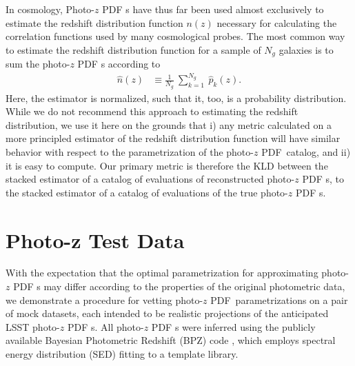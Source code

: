 \documentclass[\docopts]{\docclass}
\newcommand{\pz}{photo-$z$ PDF\xspace}
\newcommand{\Pz}{Photo-$z$ PDF\xspace}
\begin{document}
In cosmology, \Pz s have thus far been used almost exclusively to estimate the redshift
distribution function $n(z)$ necessary for calculating the correlation
functions used by many cosmological probes.  The most common way to estimate
the redshift distribution function for a sample of $N_{g}$ galaxies is to sum the \pz s according to
\begin{align}
  \label{eq:nz}
  \hat{n}(z) &\equiv \frac{1}{N_{g}}\ \sum_{k=1}^{N_{g}}\ \hat{p}_{k}(z).
\end{align}
Here, the
estimator is normalized, such that it, too, is a probability distribution.
While we do not recommend this
approach to estimating the redshift distribution,
we use it here on the grounds that i) any metric calculated on a more principled estimator of the
redshift distribution function will have similar behavior with respect to the
parametrization of the \pz\ catalog, and ii) it is easy to compute.  Our
primary metric is therefore the KLD between the stacked estimator of a catalog of
evaluations of reconstructed \pz s, to the stacked estimator of a catalog of
evaluations of the true \pz s.


\section{Photo-z Test Data}
\label{sec:data}

With the expectation that the optimal parametrization for approximating \pz s may differ according to the properties of the original photometric data, we demonstrate a procedure for vetting \pz\
parametrizations on a pair of mock datasets, each intended to be realistic
projections of the anticipated LSST \pz s.  All \pz s were inferred using the
publicly available Bayesian Photometric Redshift (BPZ) code
\citep{benitez_bayesian_2000}, which employs spectral energy distribution (SED)
fitting to a template library.
\end{document}
